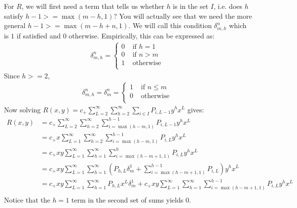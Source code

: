 	For $R$, we will first need a term that tells us whether $h$ is in the set $I$, i.e. does $h$ satisfy $h-1>=\max(m-h, 1)$? You will actually see that we need the more general $h-1>=\max(m-h+n, 1)$. We will call this condition $\delta_{m, h}^n$ which is $1$ if satisfied and $0$ otherwise. Empirically, this can be expressed as:
	\begin{align}
		\delta_{m, h}^n = \begin{cases}
			0 & \text{ if } h = 1 \\
			0 & \text{ if } n > m \\
			1 & \text{ otherwise } \\
		\end{cases}
	\end{align}
	Since $h >=2$,
	\begin{align}
		\delta_{m, h}^n = \delta_m^n = \begin{cases}
			1 & \text{ if } n \le m\\
			0 & \text{ otherwise } \\
		\end{cases}
	\end{align}
	Now solving $R(x, y)= c_+ \sum_{L=2}^\infty\sum_{h=2}^\infty\sum_{i\in I} P_{i, L-1}y^hx^L$ gives:
	\begin{align}
		R(x, y) &= c_+ \sum_{L=2}^\infty\sum_{h=2}^\infty\sum_{i=\max(h-m, 1)}^{h-1} P_{i, L-1}y^hx^L\\
		&= c_+x \sum_{L=1}^\infty\sum_{h=2}^\infty\sum_{i=\max(h-m, 1)}^{h-1} P_{i, L}y^hx^L\\
		&= c_+xy \sum_{L=1}^\infty\sum_{h=1}^\infty\sum_{i=\max(h-m+1, 1)}^{h} P_{i, L}y^hx^L\\
		&= c_+xy \sum_{L=1}^\infty\sum_{h=1}^\infty\left(P_{h, L}\delta_m^1 + \sum_{i=\max(h-m+1, 1)}^{h-1} P_{i, L}\right)y^hx^L\\
		&= c_+xy \sum_{L=1}^\infty\sum_{h=1}^\infty P_{h, L}x^L\delta_m^1 + c_+xy \sum_{L=1}^\infty\sum_{h=1}^\infty\sum_{i=\max(h-m+1, 1)}^{h-1} P_{i, L}y^hx^L\\
	\end{align}
	Notice that the $h=1$ term in the second set of sums yields 0.
